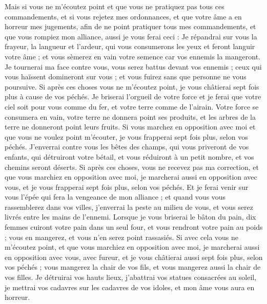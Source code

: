\begin{multicols}{2}
Mais si vous ne m'écoutez point et que vous ne pratiquez pas tous ces commandements,
et si vous rejetez mes ordonnances, et que votre âme a en horreur mes jugements, afin de ne point pratiquer tous mes commandements, et que vous rompiez mon alliance,
aussi je vous ferai ceci : Je répandrai sur vous la frayeur, la langueur et l'ardeur, qui vous consumerons les yeux et feront languir votre âme ; et vous sèmerez en vain votre semence car vos ennemis la mangeront.
Je tournerai ma face contre vous, vous serez battus devant vos ennemis ; ceux qui vous haïssent domineront sur vous ; et vous fuirez sans que personne ne vous poursuive.
Si après ces choses vous ne m'écoutez point, je vous châtierai sept fois plus à cause de vos péchés.
Je briserai l'orgueil de votre force et je ferai que votre ciel soit pour vous comme du fer, et votre terre comme de l'airain.
Votre force se consumera en vain, votre terre ne donnera point ses produits, et les arbres de la terre ne donneront point leurs fruits.
Si vous marchez en opposition avec moi et que vous ne voulez point m'écouter, je vous frapperai sept fois plus, selon vos péchés.
J'enverrai contre vous les bêtes des champs, qui vous priveront de vos enfants, qui détruiront votre bétail, et vous réduiront à un petit nombre, et vos chemins seront déserts.
Si après ces choses, vous ne recevez pas ma correction, et que vous marchiez en opposition avec moi,
je marcherai aussi en opposition avec vous, et je vous frapperai sept fois plus, selon vos péchés.
Et je ferai venir sur vous l'épée qui fera la vengeance de mon alliance ; et quand vous vous rassemblerez dans vos villes, j'enverrai la peste au milieu de vous, et vous serez livrés entre les mains de l'ennemi.
Lorsque je vous briserai le bâton du pain, dix femmes cuiront votre pain dans un seul four, et vous rendront votre pain au poids ; vous en mangerez, et vous n'en serez point rassasiés.
Si avec cela vous ne m'écoutez point, et que vous marchiez en opposition avec moi,
je marcherai aussi en opposition avec vous, avec fureur, et je vous châtierai aussi sept fois plus, selon vos péchés ;
vous mangerez la chair de vos fils, et vous mangerez aussi la chair de vos filles.
Je détruirai vos hauts lieux, j'abattrai vos statues consacrées au soleil, je mettrai vos cadavres sur les cadavres de vos idoles, et mon âme vous aura en horreur.

\end{multicols}
